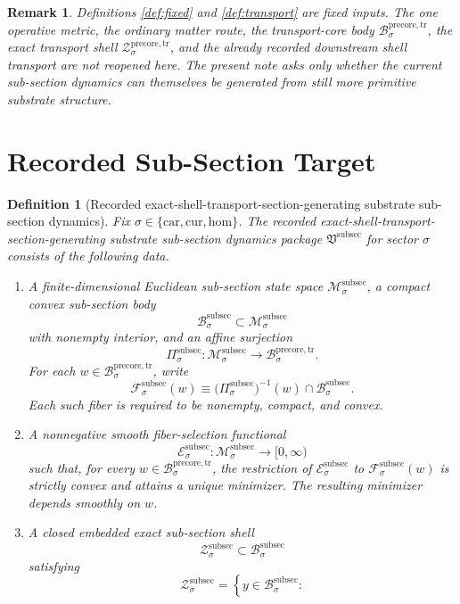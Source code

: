 \documentclass[11pt]{article}
\newcommand{\Car}{\mathrm{car}}
\newcommand{\Cur}{\mathrm{cur}}
\newcommand{\Hom}{\mathrm{hom}}
\newcommand{\PreCoreTrBody}[1]{\mathcal B_{#1}^{\mathrm{precore,tr}}}
\newcommand{\PreCoreTrShell}[1]{\mathcal Z_{#1}^{\mathrm{precore,tr}}}
\newcommand{\SubSectionPackage}{\mathfrak V^{\mathrm{subsec}}}
\newcommand{\SubSectionSpace}[1]{\mathcal M_{#1}^{\mathrm{subsec}}}
\newcommand{\SubSectionBody}[1]{\mathcal B_{#1}^{\mathrm{subsec}}}
\newcommand{\SubSectionProj}[1]{\Pi_{#1}^{\mathrm{subsec}}}
\newcommand{\SubSectionFiber}[2]{\mathcal F_{#1}^{\mathrm{subsec}}(#2)}
\newcommand{\SubSectionFunctional}[1]{\mathscr E_{#1}^{\mathrm{subsec}}}
\newcommand{\SubSectionShell}[1]{\mathcal Z_{#1}^{\mathrm{subsec}}}
\newtheorem{definition}{Definition}
\newtheorem{remark}{Remark}
\begin{document}
\begin{remark}
Definitions \ref{def:fixed} and \ref{def:transport} are fixed inputs. The one operative metric, the ordinary matter route, the transport-core body \(\PreCoreTrBody{\sigma}\), the exact transport shell \(\PreCoreTrShell{\sigma}\), and the already recorded downstream shell transport are not reopened here. The present note asks only whether the current sub-section dynamics can themselves be generated from still more primitive substrate structure.
\end{remark}

\section{Recorded Sub-Section Target}

\begin{definition}[Recorded exact-shell-transport-section-generating substrate sub-section dynamics]
\label{def:subsec}
Fix \(\sigma\in\{\Car,\Cur,\Hom\}\). The recorded exact-shell-transport-section-generating substrate sub-section dynamics package \(\SubSectionPackage\) for sector \(\sigma\) consists of the following data.
\begin{enumerate}
    \item A finite-dimensional Euclidean sub-section state space \(\SubSectionSpace{\sigma}\), a compact convex sub-section body
    \[
    \SubSectionBody{\sigma}\subset\SubSectionSpace{\sigma}
    \]
    with nonempty interior, and an affine surjection
    \[
    \SubSectionProj{\sigma}:\SubSectionSpace{\sigma}\to\PreCoreTrBody{\sigma}.
    \]
    For each \(w\in\PreCoreTrBody{\sigma}\), write
    \[
    \SubSectionFiber{\sigma}{w}
    \equiv
    \bigl(\SubSectionProj{\sigma}\bigr)^{-1}(w)\cap\SubSectionBody{\sigma}.
    \]
    Each such fiber is required to be nonempty, compact, and convex.
    \item A nonnegative smooth fiber-selection functional
    \[
    \SubSectionFunctional{\sigma}:\SubSectionSpace{\sigma}\to[0,\infty)
    \]
    such that, for every \(w\in\PreCoreTrBody{\sigma}\), the restriction of \(\SubSectionFunctional{\sigma}\) to \(\SubSectionFiber{\sigma}{w}\) is strictly convex and attains a unique minimizer. The resulting minimizer depends smoothly on \(w\).
    \item A closed embedded exact sub-section shell
    \[
    \SubSectionShell{\sigma}\subset\SubSectionBody{\sigma}
    \]
    satisfying
    \[
    \SubSectionShell{\sigma}
    =
    \left\{
    y\in\SubSectionBody{\sigma}:
\]
\end{enumerate}
\end{definition}
\end{document}
